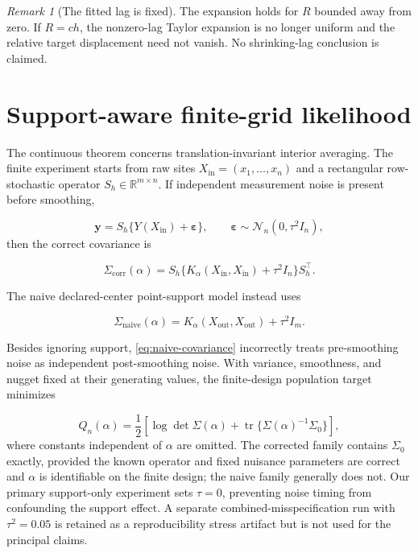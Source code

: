 \documentclass[11pt]{article}
\theoremstyle{remark}
\newtheorem{remark}{Remark}
\newcommand{\R}{\mathbb R}
\newcommand{\tr}{\operatorname{tr}}
\newcommand{\Normal}{\mathcal N}
\begin{document}
\begin{remark}[The fitted lag is fixed]
The expansion holds for \(R\) bounded away from zero.  If \(R=ch\), the
nonzero-lag Taylor expansion is no longer uniform and the relative target
displacement need not vanish.  No shrinking-lag conclusion is claimed.
\end{remark}

\section{Support-aware finite-grid likelihood}

The continuous theorem concerns translation-invariant interior averaging.  The
finite experiment starts from raw sites
\(X_{\mathrm{in}}=(x_1,\ldots,x_n)\) and a rectangular row-stochastic operator
\(S_h\in\R^{m\times n}\).  If independent measurement noise is present before
smoothing,

\begin{equation}
  \mathbf y=S_h\{Y(X_{\mathrm{in}})+\boldsymbol\varepsilon\},
  \qquad \boldsymbol\varepsilon\sim\Normal_n(0,\tau^2I_n),
\end{equation}
then the correct covariance is

\begin{equation}
  \Sigma_{\mathrm{corr}}(\alpha)
  =S_h\{K_\alpha(X_{\mathrm{in}},X_{\mathrm{in}})+\tau^2I_n\}S_h^\top.
  \label{eq:corrected-covariance}
\end{equation}

The naive declared-center point-support model instead uses

\begin{equation}
  \Sigma_{\mathrm{naive}}(\alpha)
  =K_\alpha(X_{\mathrm{out}},X_{\mathrm{out}})+\tau^2I_m.
  \label{eq:naive-covariance}
\end{equation}

Besides ignoring support, \eqref{eq:naive-covariance} incorrectly treats
pre-smoothing noise as independent post-smoothing noise.  With variance,
smoothness, and nugget fixed at their generating values, the finite-design
population target minimizes

\begin{equation}
  Q_n(\alpha)
  =\frac12\left[
    \log\det\Sigma(\alpha)
    +\tr\{\Sigma(\alpha)^{-1}\Sigma_0\}
  \right],
  \label{eq:finite-kl}
\end{equation}
where constants independent of \(\alpha\) are omitted. The corrected family
contains \(\Sigma_0\) exactly, provided the known operator and fixed nuisance
parameters are correct and \(\alpha\) is identifiable on the finite design;
the naive family generally does not. Our primary support-only experiment sets
\(\tau=0\), preventing noise timing from confounding the support effect. A
separate combined-misspecification run with \(\tau^2=0.05\) is retained as a
reproducibility stress artifact but is not used for the principal claims.
\end{document}
